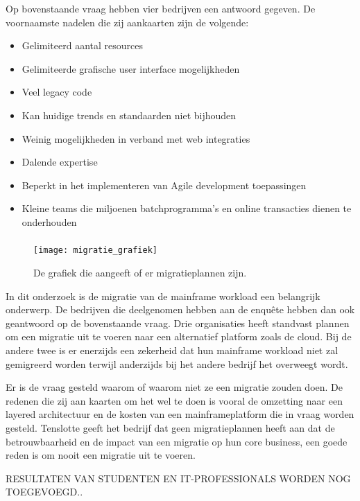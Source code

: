 Op bovenstaande vraag hebben vier bedrijven een antwoord gegeven. De voornaamste nadelen die zij aankaarten zijn de volgende:
  \begin{itemize}
     \item Gelimiteerd aantal resources 
     \item Gelimiteerde grafische user interface mogelijkheden
     \item Veel legacy code 
     \item Kan huidige trends en standaarden niet bijhouden
     \item Weinig mogelijkheden in verband met web integraties
     \item Dalende expertise
     \item Beperkt in het implementeren van Agile development toepassingen
     \item Kleine teams die miljoenen batchprogramma's en online transacties dienen te onderhouden
 \end{itemize}

\subsubsection{}
\label{sec:Heeft de organisatie migratieplannen?}

 \begin{figure}[h]
    \centering
    \texttt{[image: migratie\_grafiek]}
    \caption{De grafiek die aangeeft of er migratieplannen zijn.}
\end{figure}


In dit onderzoek is de migratie van de mainframe workload een belangrijk onderwerp. De bedrijven die deelgenomen hebben aan de enquête hebben dan ook geantwoord op de bovenstaande vraag. Drie organisaties heeft standvast plannen om een migratie uit te voeren naar een alternatief platform zoals de cloud. Bij de andere twee is er enerzijds een zekerheid dat hun mainframe workload niet zal gemigreerd worden terwijl anderzijds bij het andere bedrijf het overweegt wordt. 

Er is de vraag gesteld waarom of waarom niet ze een migratie zouden doen. De redenen die zij aan kaarten om het wel te doen is vooral de omzetting naar een layered architectuur en de kosten van een mainframeplatform die in vraag worden gesteld. Tenslotte geeft het bedrijf dat geen migratieplannen heeft aan dat de betrouwbaarheid en de impact van een migratie op hun core business, een goede reden is om nooit een migratie uit te voeren. 


RESULTATEN VAN STUDENTEN EN IT-PROFESSIONALS WORDEN NOG TOEGEVOEGD..





